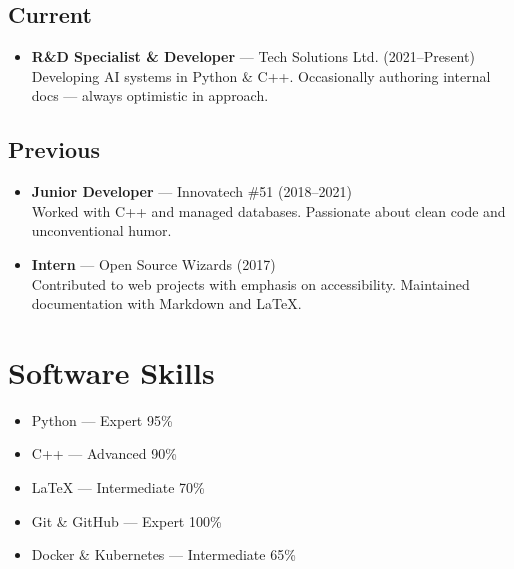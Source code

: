 \documentclass[a4paper,11pt]{article}
\begin{document}
\subsection*{Current}
\begin{itemize}

  \item \textbf{ R\&D Specialist \& Developer } — Tech Solutions Ltd. (2021–Present) \\
    Developing AI systems in Python \& C++. Occasionally authoring internal docs — always optimistic in approach.

\end{itemize}

\subsection*{Previous}
\begin{itemize}

  \item \textbf{ Junior Developer } — Innovatech \#51 (2018–2021) \\
    Worked with C++ and managed databases. Passionate about clean code and unconventional humor.

  \item \textbf{ Intern } — Open Source Wizards (2017) \\
    Contributed to web projects with emphasis on accessibility. Maintained documentation with Markdown and LaTeX.

\end{itemize}

\section*{Software Skills}
\begin{itemize}

  \item Python — Expert 95\%

  \item C++ — Advanced 90\%

  \item LaTeX — Intermediate 70\%

  \item Git \& GitHub — Expert 100\%

  \item Docker \& Kubernetes — Intermediate 65\%

\end{itemize}
\end{document}
